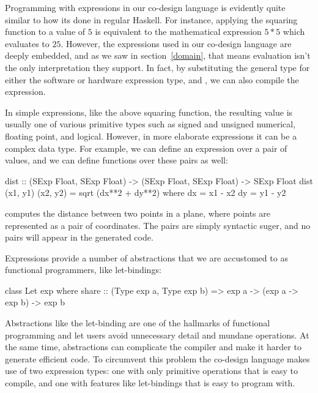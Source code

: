 \documentclass[../paper.tex]{subfiles}
\begin{document}

Programming with expressions in our co-design language is evidently quite similar to how its done in regular Haskell. For instance, applying the squaring function to a value of $5$ is equivalent to the mathematical expression $5*5$ which evaluates to $25$. However, the expressions used in our co-design language are deeply embedded, and as we saw in section~\ref{domain}, that means evaluation isn't the only interpretation they support. In fact, by substituting the general  type for either the software or hardware expression type,  and , we can also compile the expression.

In simple expressions, like the above squaring function, the resulting value is usually one of various primitive types such as signed and unsigned numerical, floating point, and logical. However, in more elaborate expressions it can be a complex data type. For example, we can define an expression over a pair of values, and we can define functions over these pairs as well:

\begin{code}
dist :: (SExp Float, SExp Float) -> (SExp Float, SExp Float) -> SExp Float
dist (x1, y1) (x2, y2) = sqrt (dx**2 + dy**2)
  where
    dx = x1 - x2
    dy = y1 - y2
\end{code}

 computes the distance between two points in a plane, where points are represented as a pair of coordinates. The pairs are simply syntactic suger, and no pairs will appear in the generated code.

Expressions provide a number of abstractions that we are accustomed to as functional programmers, like let-bindings:

\begin{code}
class Let exp where
  share :: (Type exp a, Type exp b) => exp a -> (exp a -> exp b) -> exp b
\end{code}

\noindent Abstractions like the let-binding are one of the hallmarks of functional programming and let users avoid unnecessary detail and mundane operations. At the same time, abstractions can complicate the compiler and make it harder to generate efficient code. To circumvent this problem the co-design language makes use of two expression types: one with only primitive operations that is easy to compile, and one with features like let-bindings that is easy to program with.
\end{document}
